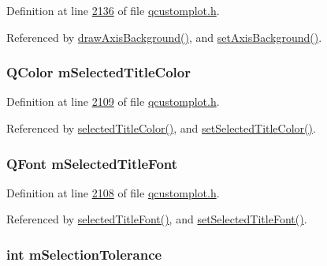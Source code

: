 Definition at line \hyperlink{a00116_source_l02136}{2136} of file \hyperlink{a00116_source}{qcustomplot.\+h}.



Referenced by \hyperlink{a00115_source_l08090}{draw\+Axis\+Background()}, and \hyperlink{a00115_source_l06222}{set\+Axis\+Background()}.

\hypertarget{a00116_a6b947daad117396a1b6f9d9fe90094d8}{
\subsubsection[{m\+Selected\+Title\+Color}]{\setlength{\rightskip}{0pt plus 5cm}Q\+Color m\+Selected\+Title\+Color}}\label{a00116_a6b947daad117396a1b6f9d9fe90094d8}


Definition at line \hyperlink{a00116_source_l02109}{2109} of file \hyperlink{a00116_source}{qcustomplot.\+h}.



Referenced by \hyperlink{a00116_source_l01978}{selected\+Title\+Color()}, and \hyperlink{a00115_source_l06372}{set\+Selected\+Title\+Color()}.

\hypertarget{a00116_a0857efaeb16b387fd17d6423d234cec8}{
\subsubsection[{m\+Selected\+Title\+Font}]{\setlength{\rightskip}{0pt plus 5cm}Q\+Font m\+Selected\+Title\+Font}}\label{a00116_a0857efaeb16b387fd17d6423d234cec8}


Definition at line \hyperlink{a00116_source_l02108}{2108} of file \hyperlink{a00116_source}{qcustomplot.\+h}.



Referenced by \hyperlink{a00116_source_l01977}{selected\+Title\+Font()}, and \hyperlink{a00115_source_l06362}{set\+Selected\+Title\+Font()}.

\hypertarget{a00116_a6694031fcdb13682d098f5d21da86f97}{
\subsubsection[{m\+Selection\+Tolerance}]{\setlength{\rightskip}{0pt plus 5cm}int m\+Selection\+Tolerance}}\label{a00116_a6694031fcdb13682d098f5d21da86f97}


